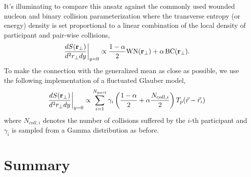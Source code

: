 \documentclass[aps,prl,reprint,amsmath,nofootinbib]{revtex4-1}
\begin{document}
It's illuminating to compare this ansatz against the commonly used wounded nucleon and binary collision parameterization where the transverse entropy (or energy) density 
is set proportional to a linear combination of the local density of participant and pair-wise collisions,
\begin{equation}
 \frac{dS({\bf r}_\perp)}{d^2r_\perp dy} \biggr \rvert_{y=0}  \propto \frac{1-\alpha}{2}\mbox{WN}({\bf r_\perp}) + \alpha\, \mbox{BC}({\bf r_\perp}). 
\end{equation}
To make the connection with the generalized mean as close as possible, we use the following implementation of a fluctuated Glauber model,
\begin{equation}
 \frac{dS({\bf r}_\perp)}{d^2r_\perp dy} \biggr \rvert_{y=0}  \propto \sum\limits_{i=1}^{N_{part}} \gamma_i \left(\frac{1-\alpha}{2} + \alpha \frac{N_{coll,i}}{2} \right ) T_p(\vec{r}-\vec{r}_i)
\end{equation}
where $N_{coll,i}$ denotes the number of collisions suffered by the $i$-th participant and $\gamma_i$ is sampled from a Gamma distribution as before.






\section{Summary}


\end{document}
